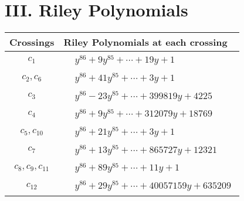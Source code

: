 \documentclass[1p]{elsarticle_modified}
\theoremstyle{definition}
\begin{document}
\centering \section*{ III. Riley Polynomials}
\begin{tabular}{m{50pt}|m{274pt}}
Crossings & \hspace{64pt}Riley Polynomials at each crossing \\
\hline $$\begin{aligned}c_{1}\end{aligned}$$&$\begin{aligned}
&y^{86}+9 y^{85}+\cdots+19 y+1
\end{aligned}$\\
\hline $$\begin{aligned}c_{2},c_{6}\end{aligned}$$&$\begin{aligned}
&y^{86}+41 y^{85}+\cdots+3 y+1
\end{aligned}$\\
\hline $$\begin{aligned}c_{3}\end{aligned}$$&$\begin{aligned}
&y^{86}-23 y^{85}+\cdots+399819 y+4225
\end{aligned}$\\
\hline $$\begin{aligned}c_{4}\end{aligned}$$&$\begin{aligned}
&y^{86}+9 y^{85}+\cdots+312079 y+18769
\end{aligned}$\\
\hline $$\begin{aligned}c_{5},c_{10}\end{aligned}$$&$\begin{aligned}
&y^{86}+21 y^{85}+\cdots+3 y+1
\end{aligned}$\\
\hline $$\begin{aligned}c_{7}\end{aligned}$$&$\begin{aligned}
&y^{86}+13 y^{85}+\cdots+865727 y+12321
\end{aligned}$\\
\hline $$\begin{aligned}c_{8},c_{9},c_{11}\end{aligned}$$&$\begin{aligned}
&y^{86}+89 y^{85}+\cdots+11 y+1
\end{aligned}$\\
\hline $$\begin{aligned}c_{12}\end{aligned}$$&$\begin{aligned}
&y^{86}+29 y^{85}+\cdots+40057159 y+635209
\end{aligned}$\\
\hline
\end{tabular}
\vskip 2pc
\end{document}
